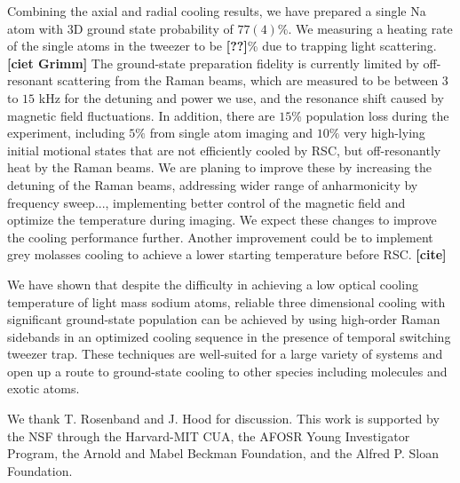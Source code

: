 \documentclass[aps,prl,twocolumn,groupedaddress]{revtex4-1}
\newcommand{\fxnote}[1]{{\textbf{[#1]}}}
\begin{document}
Combining the axial and radial cooling results,
we have prepared a single Na atom with 3D ground state probability of $77(4)\%$.
We measuring a heating rate of the single atoms in the tweezer to be \fxnote{??}\%
due to trapping light scattering.\fxnote{ciet Grimm}
The ground-state preparation fidelity is currently limited by off-resonant scattering
from the Raman beams,
which are measured to be between $3$ to $15$ kHz for the detuning and power we use,
and the resonance shift caused by magnetic field fluctuations.
In addition, there are $15$\% population loss during the experiment,
including $5\%$ from single atom imaging and  $10\%$ very high-lying initial motional states
that are not efficiently cooled by RSC, but off-resonantly heat by the Raman beams.
We are planing to improve these by increasing the detuning of the Raman beams,
addressing wider range of anharmonicity by frequency sweep...,
implementing better control of the magnetic field and optimize the temperature during imaging.
We expect these changes to improve the cooling performance further.
Another improvement could be to implement grey molasses cooling to achieve
a lower starting temperature before RSC. \fxnote{cite}

We have shown that despite the difficulty in achieving a low optical cooling temperature
of light mass sodium atoms, reliable three dimensional cooling
with significant ground-state population can be achieved by using high-order Raman sidebands
in an optimized cooling sequence in the presence of temporal switching tweezer trap.
These techniques are well-suited for a large variety of systems
and open up a route to ground-state cooling to other species including molecules and exotic atoms.

We thank T. Rosenband and J. Hood for discussion.
This work is supported by the NSF through the Harvard-MIT CUA,
the AFOSR Young Investigator Program, the Arnold and Mabel Beckman Foundation,
and the Alfred P. Sloan Foundation.



\end{document}
